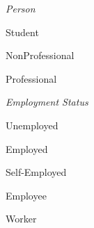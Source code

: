 \documentclass[english]{article}
\begin{document}
\begin{labelist}
    \item   
        \textit{Person}
        \begin{labelist}
            \item Student
            \item NonProfessional
            \item Professional
        \end{labelist}
    \item   
        \textit{Employment Status} \cite{employment_status_ref}
        \begin{labelist}
            \item Unemployed
            \item Employed
            	\begin{labelist}
                    \item Self-Employed
                    \item Employee
                    \item Worker
                \end{labelist}
        \end{labelist}
    

\end{labelist}
\end{document}

